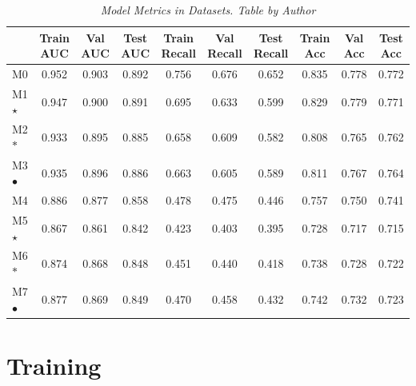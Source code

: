 \begin{landscape}

\begin{table}
\centering
\begin{tabular}{lccccccccc}
    \toprule
 & Train AUC & Val AUC &  Test AUC & Train Recall & Val Recall &  Test Recall & Train Acc & Val Acc & Test Acc \\
 \midrule
M0 & 0.952 & 0.903 & 0.892 & 0.756 & 0.676 & 0.652 & 0.835 & 0.778 & 0.772 \\
M1 $\star$ & 0.947 & 0.900 & 0.891 & 0.695 & 0.633 & 0.599 & 0.829 & 0.779 & 0.771 \\
M2 $\ast$ & 0.933 & 0.895 & 0.885 & 0.658 & 0.609 & 0.582 & 0.808 & 0.765 & 0.762 \\
M3 $\bullet$ & 0.935 & 0.896 & 0.886 & 0.663 & 0.605 & 0.589 & 0.811 & 0.767 & 0.764 \\
\cellcolor{gray!50}M4 & \cellcolor{gray!50}0.886 & \cellcolor{gray!50}0.877 & \cellcolor{gray!50}0.858 & \cellcolor{gray!50}0.478 & \cellcolor{gray!50}0.475 & \cellcolor{gray!50}0.446 & \cellcolor{gray!50}0.757 & \cellcolor{gray!50}0.750 & \cellcolor{gray!50}0.741 \\
\cellcolor{gray!50}M5 $\star$ & \cellcolor{gray!50}0.867 & \cellcolor{gray!50}0.861 & \cellcolor{gray!50}0.842 & \cellcolor{gray!50}0.423 & \cellcolor{gray!50}0.403 & \cellcolor{gray!50}0.395 & \cellcolor{gray!50}0.728 & \cellcolor{gray!50}0.717 &  \cellcolor{gray!50}0.715 \\
\cellcolor{gray!50}M6 $\ast$ & \cellcolor{gray!50}0.874 & \cellcolor{gray!50}0.868 & \cellcolor{gray!50}0.848 & \cellcolor{gray!50}0.451 & \cellcolor{gray!50}0.440 & \cellcolor{gray!50}0.418 & \cellcolor{gray!50}0.738 & \cellcolor{gray!50}0.728 &  \cellcolor{gray!50}0.722 \\
\cellcolor{gray!50}M7 $\bullet$ & \cellcolor{gray!50}0.877 & \cellcolor{gray!50}0.869 & \cellcolor{gray!50}0.849 & \cellcolor{gray!50}0.470 & \cellcolor{gray!50}0.458 & \cellcolor{gray!50}0.432 & \cellcolor{gray!50}0.742 & \cellcolor{gray!50}0.732 &  \cellcolor{gray!50}0.723 \\
\bottomrule
\end{tabular}
\caption[Model Metrics in Datasets]
  {\textit{Model Metrics in Datasets. Table by Author}}
{\label{table:resume-metrics}}
\end{table}

\end{landscape}


\section{Training}

